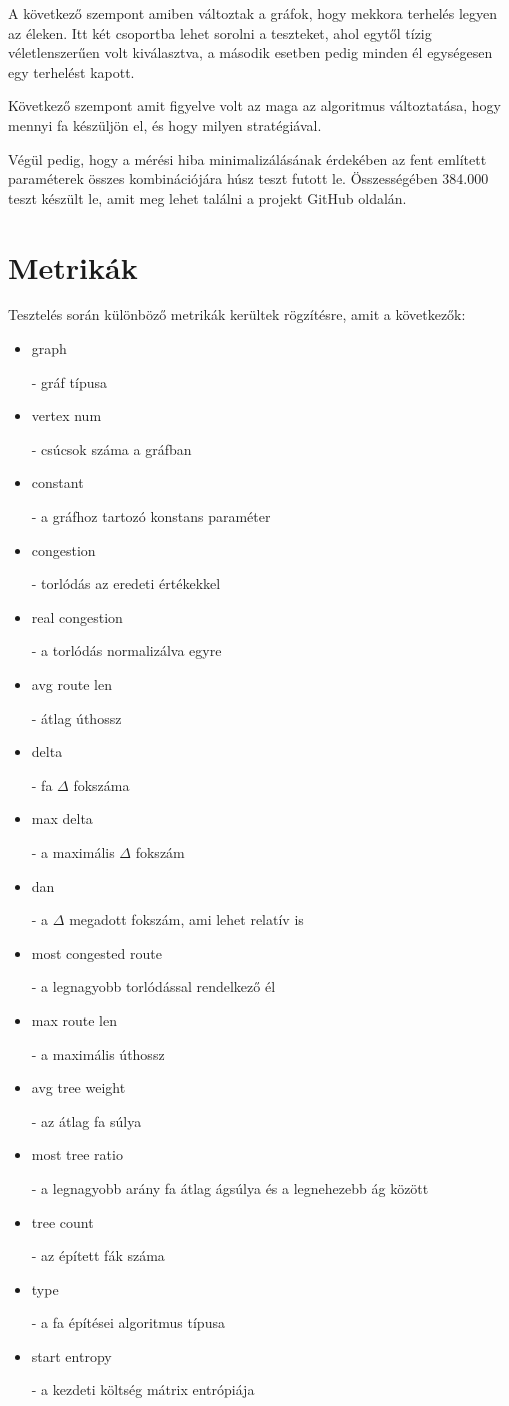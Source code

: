 \documentclass[12pt]{report}
\newcommand{\cmd}[1]{\colorbox{gray!10}{\strut #1}}
\begin{document}
A következő szempont amiben változtak a gráfok, hogy mekkora terhelés legyen az éleken.
Itt két csoportba lehet sorolni a teszteket, ahol egytől tízig véletlenszerűen volt kiválasztva, a második esetben pedig minden él egységesen egy terhelést kapott.

Következő szempont amit figyelve volt az maga az algoritmus változtatása, hogy mennyi fa készüljön el, és hogy milyen stratégiával.

Végül pedig, hogy a mérési hiba minimalizálásának érdekében az fent említett paraméterek összes kombinációjára húsz teszt futott le. 
Összességében 384.000 teszt készült le, amit meg lehet találni a projekt GitHub oldalán.

\section{Metrikák}

Tesztelés során különböző metrikák kerültek rögzítésre, amit a következők:

\begin{itemize}
	\item \cmd{graph} - gráf típusa 
	\item \cmd{vertex num} - csúcsok száma a gráfban
	\item \cmd{constant} - a gráfhoz tartozó konstans paraméter 
	\item \cmd{congestion} - torlódás az eredeti értékekkel
	\item \cmd{real congestion} - a torlódás normalizálva egyre
	\item \cmd{avg route len} - átlag úthossz
	\item \cmd{delta} - fa $\Delta$ fokszáma
	\item \cmd{max delta} - a maximális $\Delta$ fokszám
	\item \cmd{dan} - a $\Delta$ megadott fokszám, ami lehet relatív is
	\item \cmd{most congested route} - a legnagyobb torlódással rendelkező él
	\item \cmd{max route len} - a maximális úthossz
	\item \cmd{avg tree weight} - az átlag fa súlya
	\item \cmd{most tree ratio} - a legnagyobb arány fa átlag ágsúlya és a legnehezebb ág között
	\item \cmd{tree count} - az épített fák száma
	\item \cmd{type} - a fa építései algoritmus típusa
	\item \cmd{start entropy} - a kezdeti költség mátrix entrópiája
\end{itemize}
	
\end{document}

